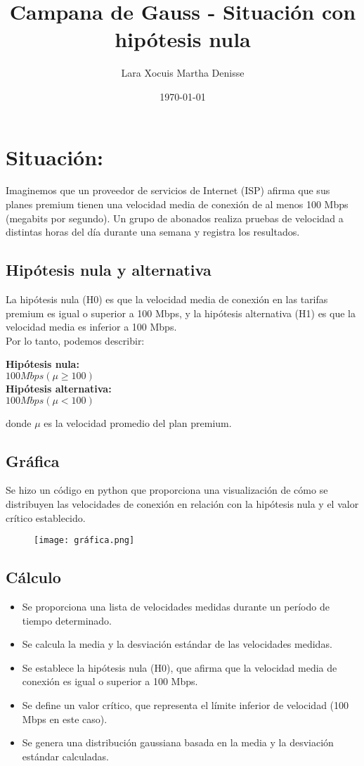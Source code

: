 \documentclass[letterpaper,12pt]{article}
\title {\textbf{Campana de Gauss - Situación con hipótesis nula}}
\author{Lara Xocuis Martha Denisse}
\date{\today}
\begin{document}
\maketitle
\begin{sloppypar} 
\section{\LARGE Situación:}
Imaginemos que un proveedor de servicios de Internet (ISP) afirma que sus planes premium tienen una velocidad media de conexión de al menos 100 Mbps (megabits por segundo). Un grupo de abonados realiza pruebas de velocidad a distintas horas del día durante una semana y registra los resultados.
\subsection*{Hipótesis nula y alternativa}
La hipótesis nula (H0) es que la velocidad media de conexión en las tarifas premium es igual o superior a 100 Mbps, y la hipótesis alternativa (H1) es que la velocidad media es inferior a 100 Mbps.
\vspace{0.3cm}\\ 
Por lo tanto, podemos describir:
\begin{center}
  \textbf{Hipótesis nula:} \\
$100 Mbps (\mu \geq 100)$
\vspace{0.3cm}\\ 
\textbf{Hipótesis alternativa:} \\
$100Mbps (\mu < 100)$
\end{center}
donde $\mu$ es la velocidad promedio del plan premium.

\subsection*{Gráfica}
Se hizo un código en python que proporciona una visualización de cómo se distribuyen las velocidades de conexión en relación con la hipótesis nula y el valor crítico establecido.
\begin{figure}[H]
  \centering 
  \texttt{[image: gráfica.png]}
\end{figure}
\subsection*{Cálculo}
\begin{itemize}
  \item Se proporciona una lista de velocidades medidas durante un período de tiempo determinado.
  \item Se calcula la media y la desviación estándar de las velocidades medidas.
  \item Se establece la hipótesis nula (H0), que afirma que la velocidad media de conexión es igual o superior a 100 Mbps.
  \item Se define un valor crítico, que representa el límite inferior de velocidad (100 Mbps en este caso).
  \item Se genera una distribución gaussiana basada en la media y la desviación estándar calculadas.
\end{itemize}

\end{sloppypar}
\end{document}
